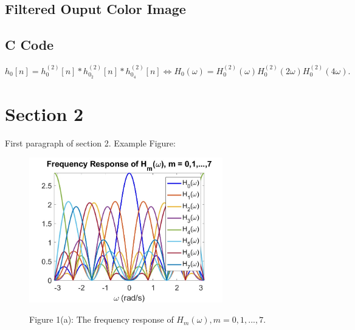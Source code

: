 \documentclass{article}
\begin{document}
\subsection{Filtered Ouput Color Image}
\subsection{C Code}

\begin{equation*}
    h_0[n] = h_{0}^{(2)}[n] \ast h_{0_2}^{(2)}[n] \ast h_{0_4}^{(2)}[n] \iff H_0(\omega) = H_0^{(2)}(\omega)H_0^{(2)}(2\omega)H_0^{(2)}(4\omega).
\end{equation*}

\section{Section 2}
First paragraph of section 2. Example Figure:
\begin{figure}[H]
    \centering
    \includegraphics[width=0.75\textwidth]{figure-example}
    \begin{center}
    Figure 1(a): The frequency response of $H_m(\omega), m = 0,1,...,7$.
    \end{center}
\end{figure}
\end{document}
